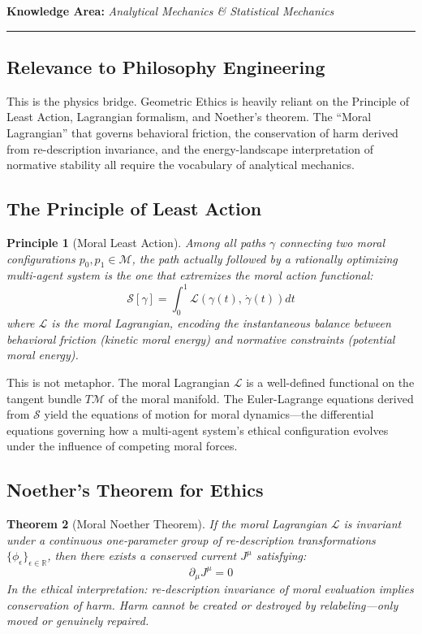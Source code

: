 \documentclass[12pt,letterpaper]{article}
\newtheorem{theorem}{Theorem}[section]
\theoremstyle{definition}
\theoremstyle{plain}
\newtheorem{principle}[theorem]{Principle}
\newcommand{\R}{\mathbb{R}}
\newcommand{\calM}{\mathcal{M}}
\newcommand{\Lag}{\mathcal{L}}
\newcommand{\ka}[1]{\vspace{1em}\noindent\textbf{\large Knowledge Area:} \textit{#1}\vspace{0.5em}\hrule\vspace{0.5em}}
\begin{document}
\ka{Analytical Mechanics \& Statistical Mechanics}

\subsection{Relevance to Philosophy Engineering}

This is the physics bridge. Geometric Ethics is heavily reliant on the Principle of Least Action, Lagrangian formalism, and Noether's theorem. The ``Moral Lagrangian'' that governs behavioral friction, the conservation of harm derived from re-description invariance, and the energy-landscape interpretation of normative stability all require the vocabulary of analytical mechanics.

\subsection{The Principle of Least Action}

\begin{principle}[Moral Least Action]
\label{princ:least-action}
Among all paths $\gamma$ connecting two moral configurations $p_0, p_1 \in \calM$, the path actually followed by a rationally optimizing multi-agent system is the one that extremizes the \emph{moral action functional}:
\begin{equation}
\mathcal{S}[\gamma] = \int_0^1 \Lag\!\left(\gamma(t),\, \dot{\gamma}(t)\right) dt
\end{equation}
where $\Lag$ is the \emph{moral Lagrangian}, encoding the instantaneous balance between behavioral friction (kinetic moral energy) and normative constraints (potential moral energy).
\end{principle}

This is not metaphor. The moral Lagrangian $\Lag$ is a well-defined functional on the tangent bundle $T\calM$ of the moral manifold. The Euler-Lagrange equations derived from $\mathcal{S}$ yield the equations of motion for moral dynamics---the differential equations governing how a multi-agent system's ethical configuration evolves under the influence of competing moral forces.

\subsection{Noether's Theorem for Ethics}

\begin{theorem}[Moral Noether Theorem]
\label{thm:noether}
If the moral Lagrangian $\Lag$ is invariant under a continuous one-parameter group of re-description transformations $\{\phi_\epsilon\}_{\epsilon \in \R}$, then there exists a conserved current $J^\mu$ satisfying:
\begin{equation}
\partial_\mu J^\mu = 0
\end{equation}
In the ethical interpretation: re-description invariance of moral evaluation implies conservation of harm. Harm cannot be created or destroyed by relabeling---only moved or genuinely repaired.
\end{theorem}
\end{document}
